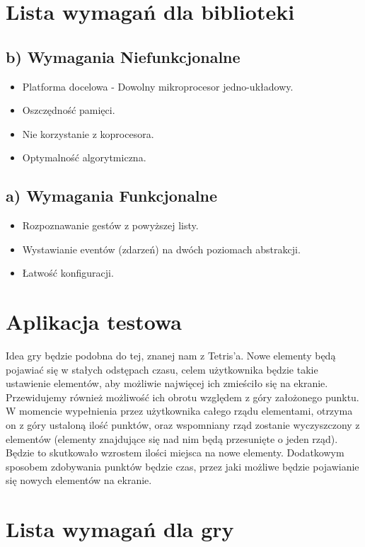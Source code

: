\documentclass[a4paper,12pt]{article}
\begin{document}
\section{\Large Lista wymagań dla biblioteki}
	\subsection*{b) Wymagania Niefunkcjonalne}
	\begin{itemize}
		\item Platforma docelowa - Dowolny mikroprocesor jedno-układowy.
		\item Oszczędność pamięci.
		\item Nie korzystanie z koprocesora.
		\item Optymalność algorytmiczna.
	\end{itemize}
   		
	\subsection*{a) Wymagania Funkcjonalne}
	\begin{itemize}
		\item Rozpoznawanie gestów z powyższej listy.
		\item Wystawianie eventów (zdarzeń) na dwóch poziomach abstrakcji.
		\item Łatwość konfiguracji.
	\end{itemize}

\section{\Large Aplikacja testowa}
Idea gry będzie podobna do tej, znanej nam z Tetris'a. Nowe elementy będą pojawiać się w stałych odstępach czasu, celem użytkownika będzie takie ustawienie elementów, aby możliwie najwięcej ich zmieściło się na ekranie. Przewidujemy również możliwość ich obrotu względem z góry założonego punktu. W momencie wypełnienia przez użytkownika całego rządu elementami, otrzyma on z góry ustaloną ilość punktów, oraz wspomniany rząd zostanie wyczyszczony z elementów (elementy znajdujące się nad nim będą przesunięte o jeden rząd). Będzie to skutkowało wzrostem ilości miejsca na nowe elementy. Dodatkowym sposobem zdobywania punktów będzie czas, przez jaki możliwe będzie pojawianie się nowych elementów na ekranie.

\section{\Large Lista wymagań dla gry}
\end{document}
